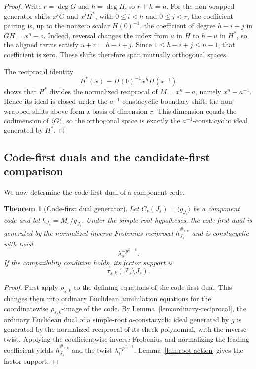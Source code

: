 \documentclass[11pt]{article}
\newcommand{\Fs}{\mathcal F_s}
\theoremstyle{plain}
\newtheorem{theorem}{Theorem}
\theoremstyle{definition}
\theoremstyle{remark}
\begin{document}
\begin{proof}
Write $r=\deg G$ and $h=\deg H$, so $r+h=n$. For the non-wrapped generator shifts $x^iG$ and $x^jH^*$, with $0\leq i<h$ and $0\leq j<r$, the coefficient pairing is, up to the nonzero scalar $H(0)^{-1}$, the coefficient of degree $h-i+j$ in $GH=x^n-a$. Indeed, reversal changes the index from $u$ in $H$ to $h-u$ in $H^*$, so the aligned terms satisfy $u+v=h-i+j$. Since $1\leq h-i+j\leq n-1$, that coefficient is zero. These shifts therefore span mutually orthogonal spaces.

The reciprocal identity
\[
H^*(x)=H(0)^{-1}x^hH(x^{-1})
\]
shows that $H^*$ divides the normalized reciprocal of $M=x^n-a$, namely $x^n-a^{-1}$. Hence its ideal is closed under the $a^{-1}$-constacyclic boundary shift; the non-wrapped shifts above form a basis of dimension $r$. This dimension equals the codimension of $\langle G\rangle$, so the orthogonal space is exactly the $a^{-1}$-constacyclic ideal generated by $H^*$.
\end{proof}

\subsection{Code-first duals and the candidate-first comparison}

We now determine the code-first dual of a component code.

\begin{theorem}[Code-first dual generator]\label{thm:dual-generator}
Let $C_s(J_s)=\langle g_{J_s}\rangle$ be a component code and let $h_{J_s}=M_s/g_{J_s}$. Under the simple-root hypotheses, the code-first dual is generated by the normalized inverse-Frobenius reciprocal $h_{J_s}^{\#_{s,k}}$ and is constacyclic with twist
\[
\lambda_s^{-p^{d_s-k}}.
\]
If the compatibility condition holds, its factor support is
\[
\tau_{s,k}(\Fs\setminus J_s).
\]
\end{theorem}

\begin{proof}
First apply $\rho_{s,k}$ to the defining equations of the code-first dual. This changes them into ordinary Euclidean annihilation equations for the coordinatewise $\rho_{s,k}$-image of the code. By Lemma~\ref{lem:ordinary-reciprocal}, the ordinary Euclidean dual of a simple-root $a$-constacyclic ideal generated by $g$ is generated by the normalized reciprocal of its check polynomial, with the inverse twist. Applying the coefficientwise inverse Frobenius and normalizing the leading coefficient yields $h_{J_s}^{\#_{s,k}}$ and the twist $\lambda_s^{-p^{d_s-k}}$. Lemma~\ref{lem:root-action} gives the factor support.
\end{proof}
\end{document}
